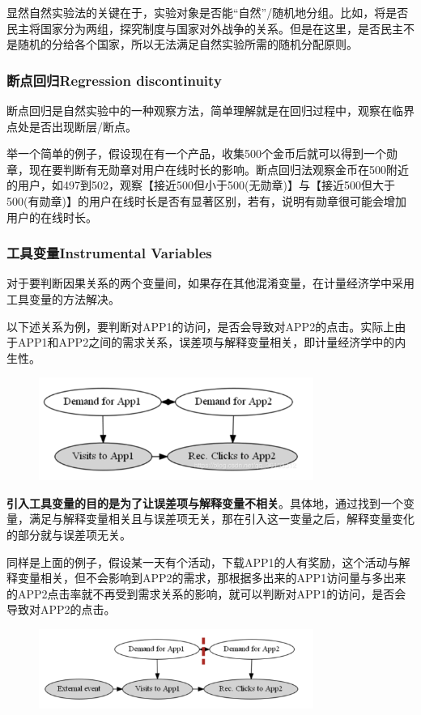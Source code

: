 \documentclass[12pt]{article}
\begin{document}
显然自然实验法的关键在于，实验对象是否能“自然”/随机地分组。比如，将是否民主将国家分为两组，探究制度与国家对外战争的关系。但是在这里，是否民主不是随机的分给各个国家，所以无法满足自然实验所需的随机分配原则。

\subsubsection{断点回归Regression discontinuity}
断点回归是自然实验中的一种观察方法，简单理解就是在回归过程中，观察在临界点处是否出现断层/断点。

举一个简单的例子，假设现在有一个产品，收集500个金币后就可以得到一个勋章，现在要判断有无勋章对用户在线时长的影响。断点回归法观察金币在500附近的用户，如497到502，观察【接近500但小于500(无勋章)】与【接近500但大于500(有勋章)】的用户在线时长是否有显著区别，若有，说明有勋章很可能会增加用户的在线时长。

\subsubsection{工具变量Instrumental Variables}
对于要判断因果关系的两个变量间，如果存在其他混淆变量，在计量经济学中采用工具变量的方法解决。

以下述关系为例，要判断对APP1的访问，是否会导致对APP2的点击。实际上由于APP1和APP2之间的需求关系，误差项与解释变量相关，即计量经济学中的内生性。
\begin{figure}[H]
    \centering
    \includegraphics[width=0.8\textwidth]{fig/CasualInference-APP-User-Example.png}
\end{figure}

\textbf{引入工具变量的目的是为了让误差项与解释变量不相关}。具体地，通过找到一个变量，满足与解释变量相关且与误差项无关，那在引入这一变量之后，解释变量变化的部分就与误差项无关。

同样是上面的例子，假设某一天有个活动，下载APP1的人有奖励，这个活动与解释变量相关，但不会影响到APP2的需求，那根据多出来的APP1访问量与多出来的APP2点击率就不再受到需求关系的影响，就可以判断对APP1的访问，是否会导致对APP2的点击。
\begin{figure}[H]
    \centering
    \includegraphics[width=0.8\textwidth]{fig/CasualInference-APP-User-Example2.png}
\end{figure}
\end{document}
